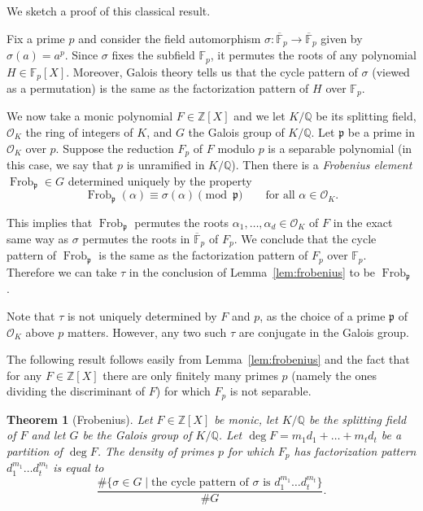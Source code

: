 \documentclass[11pt]{article}
\theoremstyle{plain}
\newtheorem{theorem}{Theorem}[section]
\theoremstyle{definition}
\theoremstyle{remark}
\numberwithin{equation}{section}
\newcommand{\longto}{\longrightarrow}
\newcommand{\ZZ}{\mathbb{Z}}
\newcommand{\FF}{\mathbb{F}}
\newcommand{\QQ}{\mathbb{Q}}
\newcommand{\Frob}{\operatorname{Frob}}
\begin{document}
We sketch a proof of this classical result.

Fix a prime $p$ and consider the field automorphism
$\sigma\colon\overline{\FF}_p\longto\overline{\FF}_p$ given by $\sigma(a)=a^p$.
Since $\sigma$ fixes the subfield $\FF_p$, it permutes the roots of any
polynomial $H\in\FF_p[X]$.  Moreover, Galois theory tells us that the cycle
pattern of $\sigma$ (viewed as a permutation) is the same as the factorization
pattern of $H$ over $\FF_p$. 

We now take a monic polynomial $F\in\ZZ[X]$ and we let $K/\QQ$ be its
splitting field, $\mathcal{O}_K$ the ring of integers of $K$, and $G$ the
Galois group of $K/\QQ$.  Let $\mathfrak{p}$ be a prime in $\mathcal{O}_K$
over $p$.  Suppose the reduction $F_p$ of $F$ modulo $p$ is a separable
polynomial (in this case, we say that $p$ is unramified in $K/\QQ$).  Then
there is a \emph{Frobenius element} $\Frob_{\mathfrak{p}}\in G$ determined
uniquely by the property
\begin{equation*}
  \Frob_{\mathfrak{p}}(\alpha)\equiv\sigma(\alpha)\pmod{\mathfrak{p}}\qquad
  \text{for all }\alpha\in\mathcal{O}_K.
\end{equation*}

This implies that $\Frob_{\mathfrak{p}}$ permutes the roots
$\alpha_1,\ldots,\alpha_d\in\mathcal{O}_K$ of $F$ in the exact same way as
$\sigma$ permutes the roots in $\overline{\FF}_p$ of $F_p$.  We conclude that
the cycle pattern of $\Frob_{\mathfrak{p}}$ is the same as the factorization
pattern of $F_p$ over $\FF_p$.  Therefore we can take $\tau$ in the conclusion
of Lemma~\ref{lem:frobenius} to be $\Frob_{\mathfrak{p}}$.

Note that $\tau$ is not uniquely determined by $F$ and $p$, as the choice of a
prime $\mathfrak{p}$ of $\mathcal{O}_K$ above $p$ matters.  However, any two
such $\tau$ are conjugate in the Galois group.

The following result follows easily from Lemma~\ref{lem:frobenius} and the
fact that for any $F\in\ZZ[X]$ there are only finitely many primes $p$ (namely
the ones dividing the discriminant of $F$) for which $F_p$ is not separable.

\begin{theorem}[Frobenius]\label{thm:frobenius}
  Let $F\in\ZZ[X]$ be monic, let $K/\QQ$ be the splitting
  field of $F$ and let $G$ be the Galois group of $K/\QQ$.  
  Let $\deg F=m_1d_1+\ldots+m_td_t$ be a partition of $\deg F$.  
  The density of primes $p$ for which $F_p$ has factorization pattern
  $d_1^{m_1}\ldots d_t^{m_t}$ is equal to
  \begin{equation*}
    \frac{\#\{\sigma\in G\mid\text{the cycle pattern of $\sigma$ is 
    $d_1^{m_1}\ldots d_t^{m_t}$}\}
    }{\# G}.
  \end{equation*}
\end{theorem}
\end{document}
